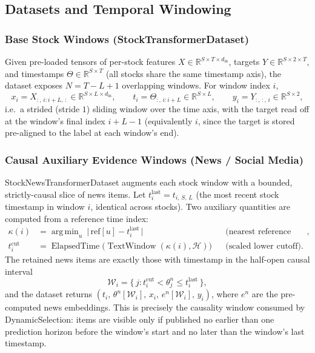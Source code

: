 \documentclass[stu,floatsintext]{apa7}
\newcommand{\R}{\mathbb{R}}
\DeclareMathOperator*{\argmin}{arg\,min}
\begin{document}
\subsection{Datasets and Temporal Windowing}

\subsubsection{Base Stock Windows (StockTransformerDataset)}

Given pre-loaded tensors of per-stock features $X\in\R^{S\times T\times d_{\mathrm{in}}}$, targets
$Y\in\R^{S\times 2\times T}$, and timestamps $\Theta\in\R^{S\times T}$ (all stocks share the same
timestamp axis), the dataset exposes $N = T-L+1$ overlapping windows. For window index $i$,
\begin{equation}
  x_i = X_{:,\,i:i+L,\,:}\in\R^{S\times L\times d_{\mathrm{in}}}, \qquad
  t_i = \Theta_{:,\,i:i+L}\in\R^{S\times L}, \qquad
  y_i = Y_{:,\,:,\,i} \in\R^{S\times 2},
\end{equation}
i.e.\ a strided (stride $1$) sliding window over the time axis, with the target read off at the window's
final index $i+L-1$ (equivalently $i$, since the target is stored pre-aligned to the label at each
window's end).

\subsubsection{Causal Auxiliary Evidence Windows (News / Social Media)}

StockNewsTransformerDataset augments each stock window with a bounded, strictly-causal slice of
news items. Let $t^{\mathrm{last}}_i = t_{i,\,S,\,L}$ (the most recent stock timestamp in window $i$,
identical across stocks). Two auxiliary quantities are computed from a reference time index:
\begin{align}
  \kappa(i) &= \argmin_{u}\ \bigl|\, \mathrm{ref}[u] - t^{\mathrm{last}}_i \,\bigr|
  && \text{(nearest reference timestamp)}, \\
  t^{\mathrm{cut}}_i &= \operatorname{ElapsedTime}\bigl(\operatorname{TextWindow}(\kappa(i), \mathcal H)\bigr)
  && \text{(scaled lower cutoff)}.
\end{align}
The retained news items are exactly those with timestamp in the half-open causal interval
\begin{equation}
  \label{eq:news-window}
  \mathcal W_i = \bigl\{\, j : t^{\mathrm{cut}}_i < \theta^{n}_j \le t^{\mathrm{last}}_i \,\bigr\},
\end{equation}
and the dataset returns $(t_i,\, \theta^{n}[\mathcal W_i],\, x_i,\, e^{n}[\mathcal W_i],\, y_i)$, where
$e^n$ are the pre-computed news embeddings. This is precisely the causality window consumed by
DynamicSelection: items are visible only if published no earlier than one
prediction horizon before the window's start and no later than the window's last timestamp.
\end{document}

